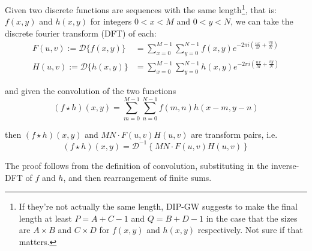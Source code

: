 		\begin{theorem} 
		Given two discrete functions are sequences with the same length\footnote{If they're
			not actually the same length, DIP-GW suggests to make the final length at least
			$P = A+C-1$ and $Q = B+D-1$ in the case that the sizes are $A\times B$ and $C\times D$ for $f(x,y)$ and  $h(x,y)$ respectively. Not sure if that matters.}, that is:
		$f(x,y)$ and $h(x,y)$ for integers $0 < x < M$ and $0 < y < N$, we can take the discrete fourier transform (DFT) of each:
		\begin{align}
		F(u,v) := \mathcal{D}\{f(x,y)\} &=
						\sum_{x=0}^{M-1} \sum_{y=0}^{N-1} f(x,y)
						e^{-2\pi i \left(\frac{ux}{M} + \frac{vy}{N}\right)} \\	
		   H(u,v) := \mathcal{D}\{h(x,y)\} &=
						\sum_{x=0}^{M-1} \sum_{y=0}^{N-1} h(x,y)
						e^{-2\pi i \left(\frac{ux}{M} + \frac{vy}{N}\right)}
		\end{align}
		
		and given the convolution of the two functions
		\begin{equation}
		\left(f \star h\right)(x,y) = \sum_{m=0}^{M-1} \sum_{n=0}^{N-1} f(m,n)h(x-m,y-n)
		\end{equation}
		
		then $\left(f \star h\right)(x,y)$ and $MN\cdot F(u,v)H(u,v)$ are transform pairs, i.e.
		\begin{equation}
		\left(f \star h\right)(x,y) = \mathcal{D}^{-1}\left\{MN\cdot F(u,v)H(u,v)\right\}
		\end{equation}
		\end{theorem}
		The proof follows from the definition of convolution, substituting in the inverse-DFT of $f$ and $h$, and then rearrangement of finite sums.
